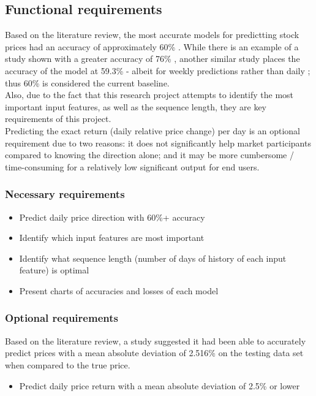 \subsection{Functional requirements}
Based on the literature review, the most accurate models for predictting stock prices had an accuracy of
approximately 60\% \parencite{zhong2019predicting}. While there is an example of a study shown with a greater
accuracy of 76\% \parencite{shen2012stock}, another similar study places the accuracy of the model at 59.3\%
- albeit for weekly predictions rather than daily \parencite{hao_gao_2020}; thus 60\% is considered the
current baseline.\\
Also, due to the fact that this research project attempts to identify the most important input features, as
well as the sequence length, they are key requirements of this project.\\
Predicting the exact return (daily relative price change) per day is an optional requirement due to two
reasons: it does not significantly help market participants compared to knowing the direction alone; and
it may be more cumbersome / time-consuming for a relatively low significant output for end users.
\subsubsection{Necessary requirements}
\begin{itemize}
    \item Predict daily price direction with 60\%+ accuracy
    \item Identify which input features are most important
    \item Identify what sequence length (number of days of history of each input feature) is optimal
    \item Present charts of accuracies and losses of each model
\end{itemize}

\subsubsection{Optional requirements}
Based on the literature review, a study suggested it had been able to accurately predict prices with a mean
absolute deviation of 2.516\% on the testing data set when compared to the true price.
\begin{itemize}
    \item Predict daily price return with a mean absolute deviation of 2.5\% or lower
\end{itemize}
